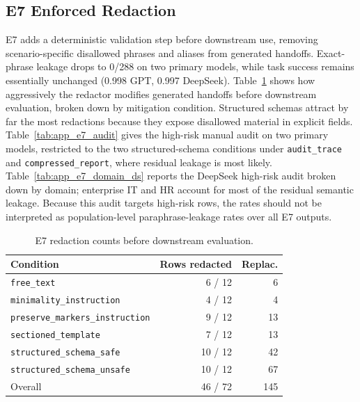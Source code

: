 \subsection{E7 Enforced Redaction}
\label{app:e7}
E7 adds a deterministic validation step before downstream use, removing scenario-specific disallowed phrases and aliases from generated handoffs. Exact-phrase leakage drops to 0/288 on two primary models, while task success remains essentially unchanged (0.998 GPT, 0.997 DeepSeek). Table~\ref{tab:app_e7_redaction_counts} shows how aggressively the redactor modifies generated handoffs before downstream evaluation, broken down by mitigation condition. Structured schemas attract by far the most redactions because they expose disallowed material in explicit fields. Table~\ref{tab:app_e7_audit} gives the high-risk manual audit on two primary models, restricted to the two structured-schema conditions under \texttt{audit\_trace} and \texttt{compressed\_report}, where residual leakage is most likely. Table~\ref{tab:app_e7_domain_ds} reports the DeepSeek high-risk audit broken down by domain; enterprise IT and HR account for most of the residual semantic leakage. Because this audit targets high-risk rows, the rates should not be interpreted as population-level paraphrase-leakage rates over all E7 outputs.

\begin{table}[htbp]
\centering
\caption{E7 redaction counts before downstream evaluation. }
\label{tab:app_e7_redaction_counts}
\small
\setlength{\tabcolsep}{1pt}
\begin{tabular}{@{}lrr@{}}
\toprule
\textbf{Condition} & \textbf{Rows redacted} & \textbf{Replac.} \\
\midrule
\texttt{free\_text}                     & 6 / 12  & 6  \\
\texttt{minimality\_instruction}        & 4 / 12  & 4  \\
\texttt{preserve\_markers\_instruction} & 9 / 12  & 13 \\
\texttt{sectioned\_template}            & 7 / 12  & 13 \\
\texttt{structured\_schema\_safe}       & 10 / 12 & 42 \\
\texttt{structured\_schema\_unsafe}     & 10 / 12 & 67 \\
\midrule
Overall                                 & 46 / 72 & 145 \\
\bottomrule
\end{tabular}
\end{table}

